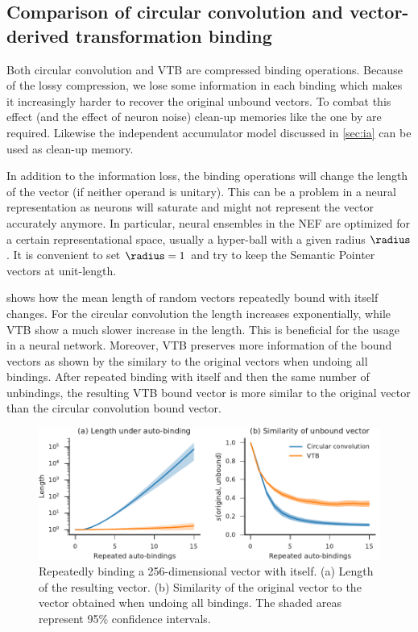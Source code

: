 \subsection{Comparison of circular convolution and vector-derived transformation binding}
Both circular convolution and VTB are compressed binding operations.
Because of the lossy compression, we lose some information in each binding which makes it increasingly harder to recover the original unbound vectors.
To combat this effect (and the effect of neuron noise) clean-up memories like the one by \textcite{stewart2011} are required.
Likewise the independent accumulator model discussed in \cref{sec:ia} can be used as clean-up memory.

In addition to the information loss, the binding operations will change the length of the vector (if neither operand is unitary).
This can be a problem in a neural representation as neurons will saturate and might not represent the vector accurately anymore.
In particular, neural ensembles in the NEF are optimized for a certain representational space, usually a hyper-ball with a given radius $\radius$.
It is convenient to set $\radius = 1$ and try to keep the Semantic Pointer vectors at unit-length.

 shows how the mean length of random vectors repeatedly bound with itself changes.
For the circular convolution the length increases exponentially, while VTB show a much slower increase in the length.
This is beneficial for the usage in a neural network.
Moreover, VTB preserves more information of the bound vectors as shown by the similary to the original vectors when undoing all bindings.
After repeated binding with itself and then the same number of unbindings, the resulting VTB bound vector is more similar to the original vector than the circular convolution bound vector.
\begin{figure}
    \centering
    \includegraphics{figures/bindings-autoconv}
    \caption{Repeatedly binding a 256-dimensional vector with itself. (a) Length of the resulting vector. (b) Similarity of the original vector to the vector obtained when undoing all bindings. The shaded areas represent 95\% confidence intervals.}\label{fig:bindings-autoconv}
\end{figure}


